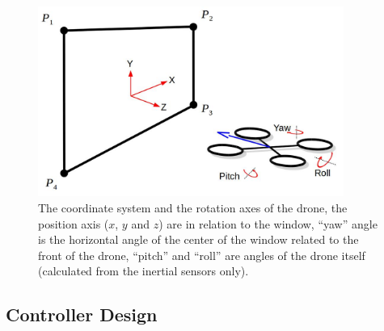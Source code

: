 \documentclass[ twoside, 12pt ]{article}
\newcommand{\commentOut}[1]{}
\begin{document}
\commentOut{
\todo[inline]{need to add paragraph on the system linearized model}

In practice, we measure the $V_d$ and $sz$ from the image and calculate the $x$ axis position, we also estimate the $x$ acceleration from the roll angle measurement. The state variables of the $x$ axis are: position ($p_x$), velocity ($v_x$), and acceleration ($a_x$) in the $x$ direction.
For the prediction step we use the model: $a_{x}[k] = a_{x}[k-1]$ $v_{x}[k] = v_{x}[k-1] + a_{x}[k-1] \cdot dt$ $p_{x}[k] = p_{x}[k-1] + v_{x}[k-1] \cdot dt$ where $dt$ is the time passed from the last iteration. 
Then for the update step we 
}

\commentOut{
$$ x(k) = 
\begin{pmatrix}
    p_k\\
    v_k\\
    a_k
\end{pmatrix}
=
\begin{pmatrix}
1 & dt & 0\\
0 & 1 & dt\\
0 & 0 & 1
\end{pmatrix}
\cdot x(k-1)
$$
}

\begin{figure} %
    \centerline{\includegraphics[width=100mm]{axis.jpg}}
    \caption{The coordinate system and the rotation axes of the drone, the position axis ($x$, $y$ and $z$) are in relation to the window, ``yaw'' angle is the horizontal angle of the center of the window related to the front of the drone, ``pitch'' and ``roll'' are angles of the drone itself (calculated from the inertial sensors only).}
    \label{fig:axis}
\end{figure}

\subsection{Controller Design}
\label{sec:Controller Design}
\end{document}
